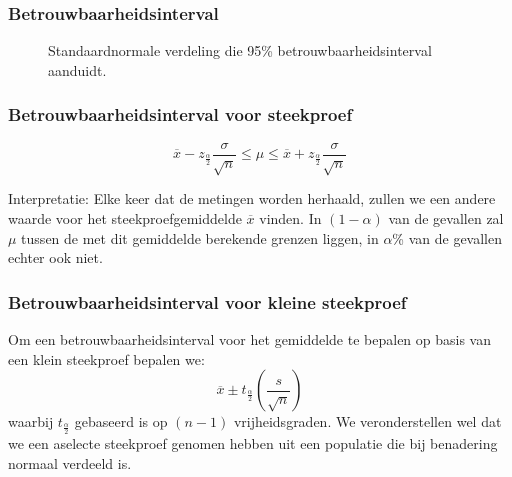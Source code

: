 \begin{frame}
	\frametitle{Betrouwbaarheidsinterval}
	\begin{figure}[t]
		\centering
		\caption{Standaardnormale verdeling die 95\% betrouwbaarheidsinterval aanduidt.}
		\label{fig:verdelingStandaardnormaal}
	\end{figure}
\end{frame}

\begin{frame}
	\frametitle{Betrouwbaarheidsinterval voor steekproef}

	
	\[  \overline{x} - z_{\frac{\alpha}{2}} \frac{\sigma}{\sqrt{n}} \leq \mu  \leq \overline{x} + z_{\frac{\alpha}{2}}\frac{\sigma}{\sqrt{n}}  \]
	
	Interpretatie: Elke keer dat de metingen worden herhaald, zullen we een andere waarde voor het steekproefgemiddelde $\overline{x}$ vinden. In $(1-\alpha)$ van de gevallen zal $\mu$ tussen de met dit gemiddelde berekende grenzen liggen, in $\alpha$\% van de gevallen echter ook niet. 
	
\end{frame}



\begin{frame}
	\frametitle{Betrouwbaarheidsinterval voor kleine steekproef}
	Om een betrouwbaarheidsinterval voor het gemiddelde te bepalen op basis van een klein steekproef bepalen we:
	\[ \overline{x} \pm t_{\frac{\alpha}{2}}(\frac{s}{\sqrt{n}}) \]
	waarbij $t_{\frac{\alpha}{2}}$ gebaseerd is op $(n-1)$ vrijheidsgraden. We veronderstellen wel dat we een aselecte steekproef genomen hebben uit
	een populatie die bij benadering normaal verdeeld is.
\end{frame}

